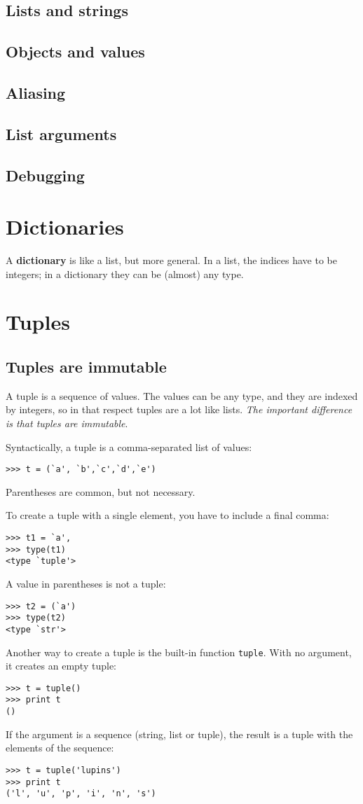 \documentclass{article}
\begin{document}
\subsection{Lists and strings}
\subsection{Objects and values}
\subsection{Aliasing}
\subsection{List arguments}
\subsection{Debugging}

\newpage  %
\section{Dictionaries}
A \textbf{dictionary} is like a list, but more general. In a list, the indices have
to be integers; in a dictionary they can be (almost) any type.

\section{Tuples}
\subsection{Tuples are immutable}
A tuple is a sequence of values. The values can be any type, and they are
indexed by integers, so in that respect tuples are a lot like lists.
\emph{The important difference is that tuples are immutable}.

Syntactically, a tuple is a comma-separated list of values:
\begin{verbatim}
>>> t = (`a', `b',`c',`d',`e')
\end{verbatim}
Parentheses are common, but not necessary.

To create a tuple with a single element, you have to include a final comma:
\begin{verbatim}
>>> t1 = `a',
>>> type(t1)
<type `tuple'>
\end{verbatim}
A value in parentheses is not a tuple:
\begin{verbatim}
>>> t2 = (`a')
>>> type(t2)
<type `str'>
\end{verbatim}
Another way to create a tuple is the built-in function \verb|tuple|.
With no argument, it creates an empty tuple:
\begin{verbatim}
>>> t = tuple()
>>> print t
()
\end{verbatim}
If the argument is a sequence (string, list or tuple), the result is a
tuple with the elements of the sequence:
\begin{verbatim}
>>> t = tuple('lupins')
>>> print t
('l', 'u', 'p', 'i', 'n', 's')
\end{verbatim}
\end{document}
